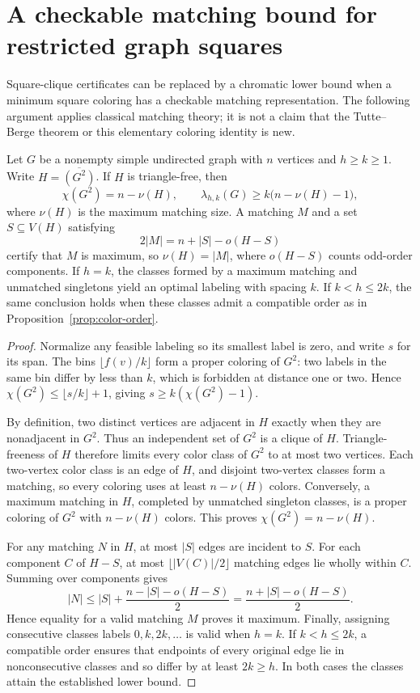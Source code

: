 \section{A checkable matching bound for restricted graph squares}
\label{sec:matching-bound}
Square-clique certificates can be replaced by a chromatic lower bound
when a minimum square coloring has a checkable matching representation.
The following argument applies classical matching theory; it is not a
claim that the Tutte--Berge theorem or this elementary coloring identity
is new.

\begin{proposition}
\label{prop:matching-bound}
Let $G$ be a nonempty simple undirected graph with $n$ vertices and
$h\geq k\geq1$. Write $H=\overline{\left(G^2\right)}$. If $H$ is triangle-free, then
\[
 \chi(G^2)=n-\nu(H),\qquad
 \lambda_{h,k}(G)\geq k\bigl(n-\nu(H)-1\bigr),
\]
where $\nu(H)$ is the maximum matching size. A matching $M$ and a set
$S\subseteq V(H)$ satisfying
\begin{equation}
 2|M|=n+|S|-o(H-S)
 \label{eq:matching-certificate}
\end{equation}
certify that $M$ is maximum, so $\nu(H)=|M|$, where $o(H-S)$ counts
odd-order components. If $h=k$, the classes formed by a maximum matching
and unmatched singletons yield an optimal labeling with spacing $k$.
If $k<h\leq2k$, the same conclusion holds when these classes admit a
compatible order as in Proposition~\ref{prop:color-order}.
\end{proposition}
\begin{proof}
Normalize any feasible labeling so its smallest label is zero, and
write $s$ for its span. The bins $\lfloor f(v)/k\rfloor$ form a proper
coloring of $G^2$: two labels in the same bin differ by less than $k$,
which is forbidden at distance one or two. Hence
$\chi(G^2)\leq\lfloor s/k\rfloor+1$, giving
$s\geq k(\chi(G^2)-1)$.

By definition, two distinct vertices are adjacent in $H$ exactly when
they are nonadjacent in $G^2$. Thus an independent set of $G^2$ is a
clique of $H$. Triangle-freeness of $H$ therefore limits every color
class of $G^2$ to at most two vertices. Each two-vertex color class is
an edge of $H$, and disjoint two-vertex classes form a matching, so
every coloring uses at least $n-\nu(H)$ colors. Conversely, a maximum
matching in $H$, completed by unmatched singleton classes, is a proper
coloring of $G^2$ with $n-\nu(H)$ colors. This proves
$\chi(G^2)=n-\nu(H)$.

For any matching $N$ in $H$, at most $|S|$ edges are incident to $S$.
For each component $C$ of $H-S$, at most
$\lfloor |V(C)|/2\rfloor$ matching edges lie wholly within $C$.
Summing over components gives
\[
 |N|\leq |S|+\frac{n-|S|-o(H-S)}{2}
       =\frac{n+|S|-o(H-S)}{2}.
\]
Hence equality for a valid matching $M$ proves it maximum. Finally,
assigning consecutive classes labels $0,k,2k,\ldots$ is valid when
$h=k$. If $k<h\leq2k$, a compatible order ensures that endpoints of
every original edge lie in nonconsecutive classes and so differ by at
least $2k\geq h$. In both cases the classes attain the established
lower bound.
\end{proof}

